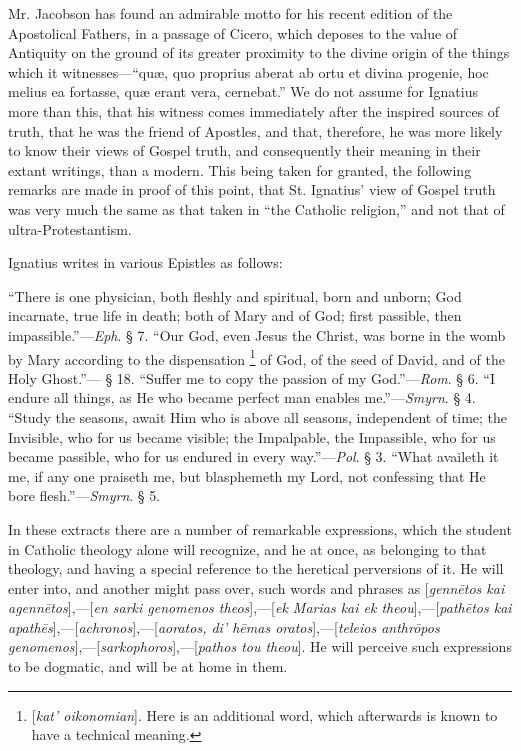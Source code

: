 Mr. Jacobson has found an admirable motto for his
recent edition of the Apostolical Fathers, in a passage of Cicero,
which deposes to the value of Antiquity on the ground of its greater
proximity to the divine origin of the things which it witnesses—``quæ,
quo proprius aberat ab ortu et divina progenie, hoc melius ea fortasse,
quæ erant vera, cernebat.'' We do not assume for Ignatius more than
this, that his witness comes immediately after the inspired sources of
truth, that he was the friend of Apostles, and that, therefore, he was
more likely to know their views of Gospel truth, and consequently
their meaning in their extant writings, than a modern. This being
taken for granted, the following remarks are made in proof of this
point, that St. Ignatius' view of Gospel truth was very much the same
as that taken in ``the Catholic religion,'' and not that of
ultra-Protestantism.

Ignatius writes in various Epistles as follows:

``There
is one physician, both fleshly and spiritual, born and unborn; God
incarnate, true life in death; both of Mary and of God; first passible,
then impassible.''—\emph{Eph}. § 7. ``Our God, even Jesus the Christ,
was borne in the womb by Mary according to the dispensation
\footnote{[\emph{kat' oikonomian}]. Here is an additional word, which afterwards
is known to have a technical meaning.} of
God, of the seed of David, and of the Holy Ghost.''— § 18. ``Suffer
me to copy the passion of my God.''—\emph{Rom}. § 6. ``I endure all
things, as He who became perfect man enables me.''—\emph{Smyrn}. §
4. ``Study the seasons, await Him who is above all seasons, independent
of time; the Invisible, who for us became visible; the Impalpable, the
Impassible, who for us became passible, who for us endured in every
way.''—\emph{Pol}. § 3. ``What availeth it me, if any one praiseth
me, but blasphemeth my Lord, not confessing that He bore flesh.''—\emph{Smyrn}.
§ 5.

In these extracts there are a number of
remarkable expressions, which the student in Catholic theology alone
will recognize, and he at once, as belonging to that theology, and
having a special reference to the heretical perversions of it. He will
enter into, and another might pass over, such words and phrases as [\emph{genn\={e}tos
kai agenn\={e}tos}],—[\emph{en sarki genomenos theos}],—[\emph{ek
Marias kai ek theou}],—[\emph{path\={e}tos kai apath\={e}s}],—[\emph{achronos}],—[\emph{aoratos,
di' h\={e}mas oratos}],—[\emph{teleios anthr\={o}pos genomenos}],—[\emph{sarkophoros}],—[\emph{pathos
tou theou}]. He will perceive such expressions to be dogmatic, and
will be at home in them.

